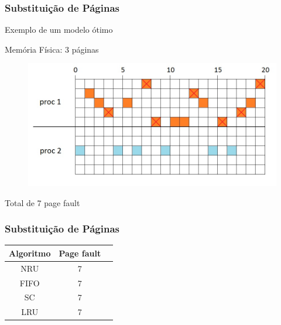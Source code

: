 \documentclass{beamer}
\begin{document}
\begin{frame}
\frametitle{Substituição de Páginas} 

Exemplo de um modelo ótimo

Memória Física: 3 páginas

\begin{figure}
\centering
\includegraphics[scale=0.4]{fimfim1.png}
\end{figure}

Total de 7 page fault

\justifying
\end{frame}


\begin{frame}
\frametitle{Substituição de Páginas} 

\begin{table}[h!]
  \begin{center}
   	\label{tab:table1}
    \begin{tabular}{ccc}
      \toprule
      Algoritmo & Page fault\\
      \midrule
      NRU & 7\\
      FIFO & 7\\
      SC & 7\\
      LRU & 7\\
            
      \bottomrule
    \end{tabular}
  \end{center}
\end{table}

\justifying
\end{frame}
\end{document}
